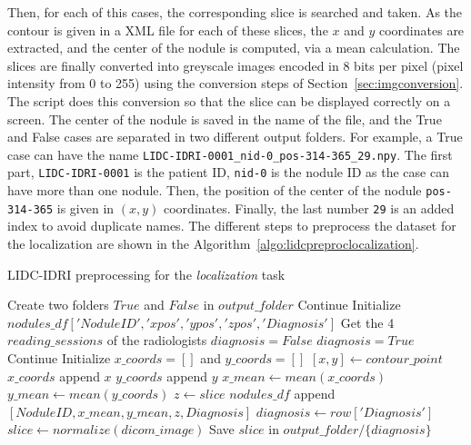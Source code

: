 Then, for each of this cases, the corresponding slice is searched and taken. As the contour is given in a XML file for each of these slices, the $x$ and $y$ coordinates are extracted, and the center of the nodule is computed, via a mean calculation. The slices are finally converted into greyscale images encoded in 8 bits per pixel (pixel intensity from 0 to 255) using the conversion steps of Section~\ref{sec:imgconversion}. The script does this conversion so that the slice can be displayed correctly on a screen. The center of the nodule is saved in the name of the file, and the True and False cases are separated in two different output folders. For example, a True case can have the name \texttt{LIDC-IDRI-0001\_nid-0\_pos-314-365\_29.npy}. The first part, \texttt{LIDC-IDRI-0001} is the patient ID, \texttt{nid-0} is the nodule ID as the case can have more than one nodule. Then, the position of the center of the nodule \texttt{pos-314-365} is given in $(x,y)$ coordinates. Finally, the last number \texttt{29} is an added index to avoid duplicate names. The different steps to preprocess the dataset for the localization are shown in the Algorithm~\ref{algo:lidcpreproclocalization}.

\begin{algorithm}[t!]
  \caption{LIDC-IDRI preprocessing for the \emph{localization} task}
  \label{algo:lidcpreproclocalization}
  \begin{algorithmic}[1]
    \State Create two folders $True$ and $False$ in $output\_folder$
     
        \State Continue
      \EndIf
      \State Initialize $nodules\_df['Nodule ID', 'x pos', 'y pos', 'z pos', 'Diagnosis']$
      \State Get the 4 $reading\_sessions$ of the radiologists 
            \State $diagnosis = False$
            \State $diagnosis = True$
          \Else
            \State Continue
          \EndIf
          \State Initialize $x\_coords = []$ and $y\_coords = []$
              \State $[x, y] \gets contour\_point$ 
              \State $x\_coords$ append $x$
              \State $y\_coords$ append $y$
            \EndFor
            \State $x\_mean \gets mean(x\_coords)$
            \State $y\_mean \gets mean(y\_coords)$
            \State $z \gets slice$
            \State $nodules\_df$ append $[NoduleID, x\_mean, y\_mean, z, Diagnosis]$
          \EndFor
        \EndFor
      \EndFor
            \State $diagnosis \gets row['Diagnosis']$
            \State $slice \gets normalize(dicom\_image)$ 
            \State Save $slice$ in $output\_folder/\{diagnosis\}$
          \EndIf
        \EndFor
      \EndFor
    \EndFor
  \end{algorithmic}
\end{algorithm}

